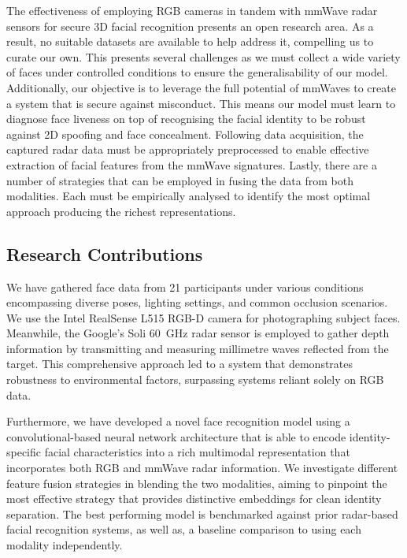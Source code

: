 \documentclass{mpaper}
\begin{document}
The effectiveness of employing RGB cameras in tandem with mmWave radar sensors for secure 3D facial recognition presents an open research area. As a result, no suitable datasets are available to help address it, compelling us to curate our own. This presents several challenges as we must collect a wide variety of faces under controlled conditions to ensure the generalisability of our model. Additionally, our objective is to leverage the full potential of mmWaves to create a system that is secure against misconduct. This means our model must learn to diagnose face liveness on top of recognising the facial identity to be robust against 2D spoofing and face concealment. Following data acquisition, the captured radar data must be appropriately preprocessed to enable effective extraction of facial features from the mmWave signatures. Lastly, there are a number of strategies that can be employed in fusing the data from both modalities. Each must be empirically analysed to identify the most optimal approach producing the richest representations.


\subsection{Research Contributions}
We have gathered face data from \num{21} participants under various conditions encompassing diverse poses, lighting settings, and common occlusion scenarios. We use the Intel RealSense L515 RGB-D camera \cite{intel-l515} for photographing subject faces. Meanwhile, the Google's Soli \qty{60}{\GHz} radar sensor \cite{lien2016soli} is employed to gather depth information by transmitting and measuring millimetre waves reflected from the target. This comprehensive approach led to a system that demonstrates robustness to environmental factors, surpassing systems reliant solely on RGB data.

Furthermore, we have developed a novel face recognition model using a convolutional-based neural network architecture that is able to encode identity-specific facial characteristics into a rich multimodal representation that incorporates both RGB and mmWave radar information. We investigate different feature fusion strategies in blending the two modalities, aiming to pinpoint the most effective strategy that provides distinctive embeddings for clean identity separation. The best performing model is benchmarked against prior radar-based facial recognition systems, as well as, a baseline comparison to using each modality independently.
\end{document}
